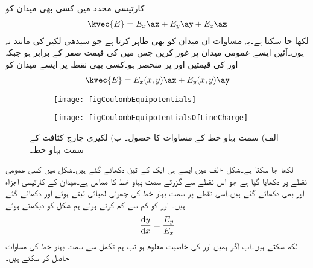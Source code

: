 کارتیسی محدد میں کسی بھی میدان کو
\begin{align*}
\kvec{E}=E_x\ax+E_y\ay+E_z\az
\end{align*}
لکھا جا سکتا ہے۔یہ مساوات ان میدان کو بھی ظاہر کرتا ہے جو سیدھی لکیر کی مانند نہ ہوں۔آئیں ایسے عمومی میدان پر غور کریں جس میں  کی قیمت صفر کے برابر ہو جبکہ  اور  کی قیمتیں  اور  پر منحصر ہو۔کسی بھی نقطہ  پر ایسے میدان کو
\begin{align}\label{مساوات_کولومب_عمومی_مارتیسی_میدان}
\kvec{E}=E_x(x,y)\ax+E_y(x,y)\ay
\end{align}
%
\begin{figure}
\centering
\begin{subfigure}{0.5\textwidth}
\centering
\texttt{[image: figCoulombEquipotentials]}
\end{subfigure}%
%
\begin{subfigure}{0.5\textwidth}
\centering
\texttt{[image: figCoulombEquipotentialsOfLineCharge]}
\end{subfigure}%
\caption{الف) سمت بہاو خط کے مساوات کا حصول۔ ب) لکیری چارج کثافت کے سمت بہاو خط۔}
\label{شکل_کولومب_سمت_بہاو_خط}
\end{figure}
لکھا  جا سکتا ہے۔شکل -الف میں ایسے ہی ایک  کے تین  دکھائے گئے ہیں۔شکل میں کسی عمومی نقطے پر  دکھایا گیا ہے جو اس نقطے سے  گزرتے سمت بہاو خط کا مماس ہے۔میدان کے کارتیسی اجزاء  اور  بھی دکھائے گئے ہیں۔اسی نقطے پر سمت بہاو خط کی چھوٹی لمبائی لیتے ہوئے  اور  دکھائے گئے ہیں۔ اور   کو کم سے کم کرتے ہوئے ہم شکل کو دیکھتے ہوئے
\begin{align}\label{مساوات_کولومب_سمت_بہاو_کارتیسی}
\frac{\dif y}{\dif x}=\frac{E_y}{E_x}
\end{align}
لکھ سکتے ہیں۔اب اگر ہمیں  اور  کی خاصیت معلوم ہو تب ہم تکمل سے سمت بہاو خط کی مساوات حاصل کر سکتے ہیں۔


